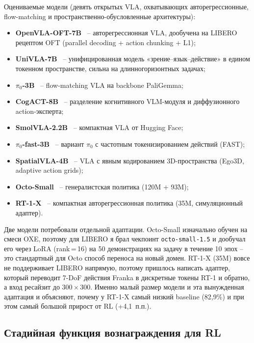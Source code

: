     Оцениваемые модели (девять открытых VLA, охватывающих авторегрессионные, flow-matching и пространственно-обусловленные архитектуры):
    \begin{itemize}
        \item \textbf{OpenVLA-OFT-7B}~\cite{kim2025fine} -- авторегрессионная VLA, дообучена на LIBERO рецептом OFT (parallel decoding + action chunking + L1);
        \item \textbf{UniVLA-7B}~\cite{univla2025} -- унифицированная модель «зрение--язык--действие» в едином токенном пространстве, сильна на длинногоризонтных задачах;
        \item \textbf{$\pi_0$-3B}~\cite{black2024pi0} -- flow-matching VLA на backbone PaliGemma;
        \item \textbf{CogACT-8B}~\cite{cogact2024} -- разделение когнитивного VLM-модуля и диффузионного action-эксперта;
        \item \textbf{SmolVLA-2.2B}~\cite{smolvla2025} -- компактная VLA от Hugging Face;
        \item \textbf{$\pi_0$-fast-3B}~\cite{black2024pi0} -- вариант $\pi_0$ с частотным токенизированием действий (FAST);
        \item \textbf{SpatialVLA-4B}~\cite{spatialvla2025} -- VLA с явным кодированием 3D-пространства (Ego3D, adaptive action grids);
        \item \textbf{Octo-Small}~\cite{octo2024} -- генералистская политика (120M + 93M);
        \item \textbf{RT-1-X}~\cite{openx2023} -- компактная авторегрессионная политика (35M, симуляционный адаптер).
    \end{itemize}

    Две модели потребовали отдельной адаптации. Octo-Small изначально обучен на смеси OXE, поэтому для LIBERO я брал чекпоинт \texttt{octo-small-1.5} и дообучал его через LoRA (rank\,=\,16) на 50 демонстрациях на задачу в течение 10 эпох -- это стандартный для Octo способ переноса на новый домен. RT-1-X (35M) вовсе не поддерживает LIBERO напрямую, поэтому пришлось написать адаптер, который переводит 7-DoF действия Franka в дискретные токены RT-1 и обратно, а вход ресайзит до $300\times300$. Именно малый размер модели и эта вынужденная адаптация и объясняют, почему у RT-1-X самый низкий baseline (82,9\%) и при этом самый большой прирост от RL (+4,1~п.п.).

\subsection{Стадийная функция вознаграждения для RL}
\label{subsec:stage_reward}


